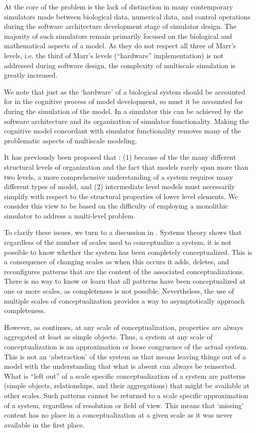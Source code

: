 \documentclass[11pt,3p,twocolumn]{JMN}
\begin{document}
At the core of the problem is the lack of distinction in many contemporary simulators made between biological data, numerical data, and control operations during the software architecture development stage of simulator design. The majority of such simulators remain primarily focused on the biological and mathematical aspects of a model. As they do not respect all three of Marr's levels, i.e. the third of Marr's levels (``hardware'' implementation) is not addressed during software design, the complexity of multiscale simulation is greatly increased. 

We note that just as the `hardware' of a biological system should be accounted for in the cognitive process of model development, so must it be accounted for during the simulation of the model. In a simulator this can be achieved by the software architecture and its organization of simulator functionality. Making the cognitive model concordant with simulator functionality removes many of the problematic aspects of multiscale modeling.  

It has previously been proposed that \cite{Sejnowski:1988fk}: (1) because of the the many different structural levels of organization and the fact that models rarely span more than two levels, a more comprehensive understanding of a system requires many different types of model, and (2) intermediate level models must necessarily simplify with respect to the structural properties of lower level elements. We consider this view to be based on the difficulty of employing a monolithic simulator to address a multi-level problem.

To clarify these issues, we turn to a discussion in \cite{Heylighen:2006vn}. Systems theory shows that regardless of the number of scales used to conceptualize a system, it is not possible to know whether the system has been completely conceptualized. This is a consequence of changing scales as when this occurs it adds, deletes, and reconfigures patterns that are the content of the associated conceptualizations. There is no way to know or learn that all patterns have been conceptualized at one or more scales, as completeness is not possible. Nevertheless, the use of multiple scales of conceptualization provides a way to asymptotically approach completeness.
 
However, as \citet{Heylighen:2006vn} continues, at any scale of conceptualization, properties are always aggregated at least as simple objects. Thus, a system at any scale of conceptualization is an approximation or loose congruence of the actual system. This is not an `abstraction' of the system as that means leaving things out of a model with the understanding that what is absent can always be reinserted. What is ``left out'' of a scale specific conceptualization of a system are patterns (simple objects, relationships, and their aggregations) that might be available at other scales. Such patterns cannot be returned to a scale specific approximation of a system, regardless of resolution or field of view. This means that `missing' content has no place in a conceptualization at a given scale as it was never available in the first place.
\end{document}
